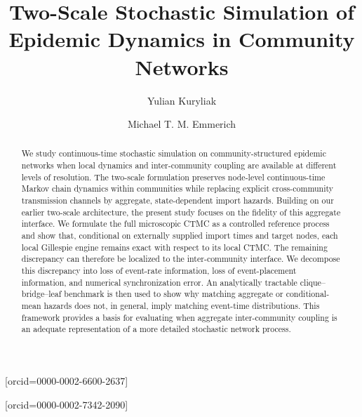 \documentclass[a4paper,fleqn]{cas-sc}
\begin{document}
\let\WriteBookmarks\relax
\def\floatpagepagefraction{1}
\def\textpagefraction{.001}


\title[mode=title]{Two-Scale Stochastic Simulation of Epidemic Dynamics in Community Networks}

\author[1]{Yulian Kuryliak}[orcid=0000-0002-6600-2637]
\cormark[1]

\author[2]{Michael T. M. Emmerich}[orcid=0000-0002-7342-2090]


\begin{abstract}
We study continuous-time stochastic simulation on community-structured epidemic networks when local dynamics and inter-community coupling are available at different levels of resolution. The two-scale formulation preserves node-level continuous-time Markov chain dynamics within communities while replacing explicit cross-community transmission channels by aggregate, state-dependent import hazards. Building on our earlier two-scale architecture, the present study focuses on the fidelity of this aggregate interface. We formulate the full microscopic CTMC as a controlled reference process and show that, conditional on externally supplied import times and target nodes, each local Gillespie engine remains exact with respect to its local CTMC. The remaining discrepancy can therefore be localized to the inter-community interface. We decompose this discrepancy into loss of event-rate information, loss of event-placement information, and numerical synchronization error. An analytically tractable clique--bridge--leaf benchmark is then used to show why matching aggregate or conditional-mean hazards does not, in general, imply matching event-time distributions. This framework provides a basis for evaluating when aggregate inter-community coupling is an adequate representation of a more detailed stochastic network process.
\end{abstract}
\end{document}
